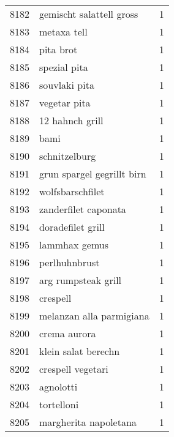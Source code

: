 \begin{tabular}{llr}
8182 &                           gemischt salattell gross &      1 \\
8183 &                                        metaxa tell &      1 \\
8184 &                                          pita brot &      1 \\
8185 &                                       spezial pita &      1 \\
8186 &                                      souvlaki pita &      1 \\
8187 &                                       vegetar pita &      1 \\
8188 &                                    12 hahnch grill &      1 \\
8189 &                                               bami &      1 \\
8190 &                                      schnitzelburg &      1 \\
8191 &                         grun spargel gegrillt birn &      1 \\
8192 &                                   wolfsbarschfilet &      1 \\
8193 &                               zanderfilet caponata &      1 \\
8194 &                                  doradefilet grill &      1 \\
8195 &                                      lammhax gemus &      1 \\
8196 &                                      perlhuhnbrust &      1 \\
8197 &                                arg rumpsteak grill &      1 \\
8198 &                                           crespell &      1 \\
8199 &                           melanzan alla parmigiana &      1 \\
8200 &                                       crema aurora &      1 \\
8201 &                                klein salat berechn &      1 \\
8202 &                                  crespell vegetari &      1 \\
8203 &                                          agnolotti &      1 \\
8204 &                                         tortelloni &      1 \\
8205 &                              margherita napoletana &      1 \\

\end{tabular}
